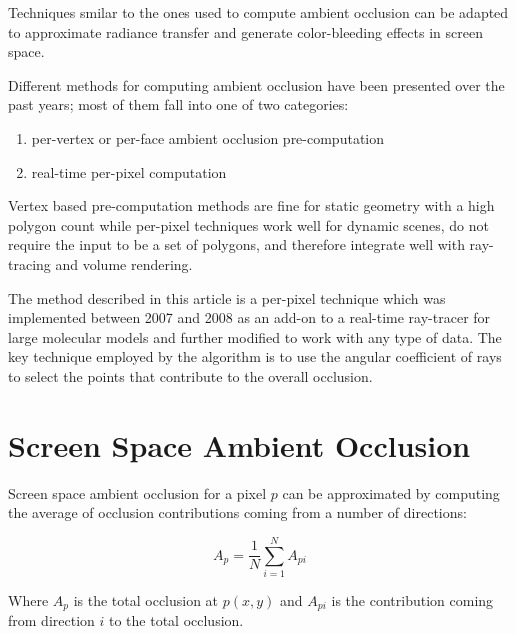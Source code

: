 \documentclass{article}
\begin{document}

Techniques smilar to the ones used to compute ambient occlusion 
can be adapted to approximate radiance transfer and generate color-bleeding effects in screen space.

Different methods for computing ambient occlusion have been presented over the
past years; most of them fall into one of two categories: 

\begin{enumerate}
	\item per-vertex or per-face ambient occlusion pre-computation
	\item real-time per-pixel computation
\end{enumerate}

Vertex based pre-computation methods are fine for static geometry with a high polygon
count while per-pixel techniques work well for dynamic scenes, do not require the input
to be a set of polygons, and therefore integrate well with ray-tracing and volume rendering. 

The method described in this article is a per-pixel technique which was implemented
between 2007 and 2008 as an add-on to a real-time ray-tracer for large molecular models
and further modified to work with any type of data.
The key technique employed by the algorithm is to use the angular coefficient of rays
to select the points that contribute to the overall occlusion.
 

\section{Screen Space Ambient Occlusion}

Screen space ambient occlusion for a pixel $p$ can be approximated by 
computing the average of occlusion contributions coming from a number of directions:

\begin{equation}
A_{p} = \frac{1}{N}\sum_{i=1}^N A_{pi}
\label{ssao}
\end{equation}

Where $A_{p}$ is the total occlusion at $p(x,y)$ and $A_{pi}$ is the contribution 
coming from direction $i$ to the total occlusion.
\end{document}
